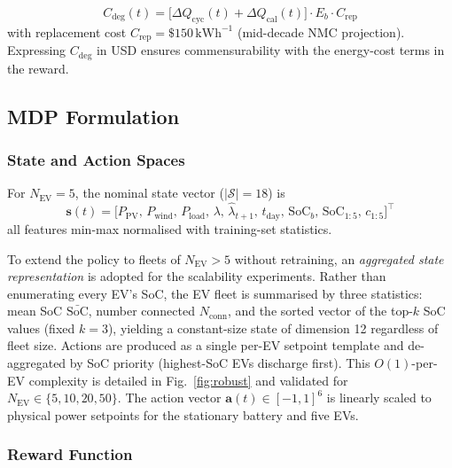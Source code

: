 \documentclass[journal,10pt,twocolumn]{IEEEtran}
\begin{document}
\begin{equation}
C_\mathrm{deg}(t)=\bigl[\Delta Q_\mathrm{cyc}(t)
    +\Delta Q_\mathrm{cal}(t)\bigr]\cdot E_b\cdot C_\mathrm{rep}
\label{eq:cdeg}
\end{equation}
with replacement cost $C_\mathrm{rep}=\$150\,\mathrm{kWh}^{-1}$
(mid-decade NMC projection).
Expressing $C_\mathrm{deg}$ in USD ensures commensurability with the
energy-cost terms in the reward.

\subsection{MDP Formulation}

\subsubsection{State and Action Spaces}

For $N_\mathrm{EV}=5$, the nominal state vector ($|\mathcal{S}|=18$) is
\begin{equation}
\mathbf{s}(t)=\bigl[P_\mathrm{PV},\,P_\mathrm{wind},\,P_\mathrm{load},
    \,\lambda,\,\hat{\lambda}_{t+1},\,t_\mathrm{day},\,
    \mathrm{SoC}_b,\,\mathrm{SoC}_{1:5},\,c_{1:5}\bigr]^\top
\label{eq:state}
\end{equation}
all features min-max normalised with training-set statistics.

To extend the policy to fleets of $N_\mathrm{EV}>5$ without
retraining, an \emph{aggregated state representation} is adopted for
the scalability experiments.
Rather than enumerating every EV's SoC, the EV fleet is summarised by
three statistics: mean SoC $\bar{\mathrm{SoC}}$, number connected
$N_\mathrm{conn}$, and the sorted vector of the top-$k$ SoC values
(fixed $k=3$), yielding a constant-size state of dimension 12
regardless of fleet size.
Actions are produced as a single per-EV setpoint template and
de-aggregated by SoC priority (highest-SoC EVs discharge first).
This $O(1)$-per-EV complexity is detailed in Fig.~\ref{fig:robust}
and validated for $N_\mathrm{EV}\in\{5,10,20,50\}$.
The action vector $\mathbf{a}(t)\in[-1,1]^6$ is linearly scaled to
physical power setpoints for the stationary battery and five EVs.

\subsubsection{Reward Function}
\end{document}
